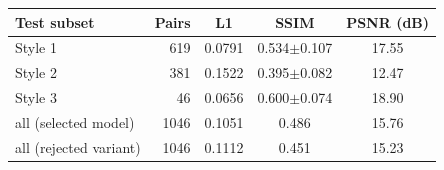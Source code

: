 \begin{tabular}{lrccc}
\toprule
Test subset & Pairs & L1 & SSIM & PSNR (dB) \\
\midrule
Style 1 & 619 & 0.0791 & 0.534$\pm$0.107 & 17.55 \\
Style 2 & 381 & 0.1522 & 0.395$\pm$0.082 & 12.47 \\
Style 3 & 46 & 0.0656 & 0.600$\pm$0.074 & 18.90 \\
\midrule
all (selected model) & 1046 & 0.1051 & 0.486 & 15.76 \\
all (rejected variant) & 1046 & 0.1112 & 0.451 & 15.23 \\
\bottomrule
\end{tabular}

